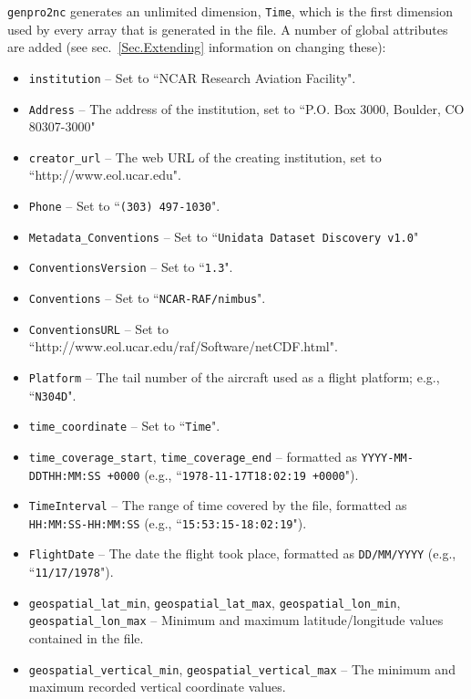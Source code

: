 \documentclass{report}
\begin{document}
\texttt{genpro2nc} generates an unlimited dimension, \texttt{Time}, which is the first dimension used by every array that is generated in the file. A number of global attributes are added (see sec.~\ref{Sec.Extending} information on changing these):
\begin{itemize}[noitemsep]
	\item \texttt{institution} -- Set to ``NCAR Research Aviation Facility".
	\item \texttt{Address} -- The address of the institution, set to ``P.O. Box 3000, Boulder, CO 80307-3000"
	\item \texttt{creator\_url} -- The web URL of the creating institution, set to ``http://www.eol.ucar.edu".
	\item \texttt{Phone} -- Set to ``\texttt{(303) 497-1030}".
	\item \texttt{Metadata\_Conventions} -- Set to ``\texttt{Unidata Dataset Discovery v1.0}"
	\item \texttt{ConventionsVersion} -- Set to ``\texttt{1.3}".
	\item \texttt{Conventions} -- Set to ``\texttt{NCAR-RAF/nimbus}".
	\item \texttt{ConventionsURL} -- Set to ``http://www.eol.ucar.edu/raf/Software/netCDF.html".
	\item \texttt{Platform} -- The tail number of the aircraft used as a flight platform; e.g., ``\texttt{N304D}".
	\item \texttt{time\_coordinate} -- Set to ``\texttt{Time}".
	\item \texttt{time\_coverage\_start}, \texttt{time\_coverage\_end} -- formatted as \texttt{YYYY-MM-DDTHH:MM:SS +0000} (e.g., \linebreak ``\texttt{1978-11-17T18:02:19 +0000}").
	\item \texttt{TimeInterval} -- The range of time covered by the file, formatted as \texttt{HH:MM:SS-HH:MM:SS} (e.g., \linebreak ``\texttt{15:53:15-18:02:19}").
	\item \texttt{FlightDate} -- The date the flight took place, formatted as \texttt{DD/MM/YYYY} (e.g., ``\texttt{11/17/1978}").
	\item \texttt{geospatial\_lat\_min}, \texttt{geospatial\_lat\_max}, \texttt{geospatial\_lon\_min}, \texttt{geospatial\_lon\_max} -- Minimum and maximum latitude/longitude values contained in the file.
	\item \texttt{geospatial\_vertical\_min}, \texttt{geospatial\_vertical\_max} -- The minimum and maximum recorded vertical coordinate values.

\end{itemize}
\end{document}
